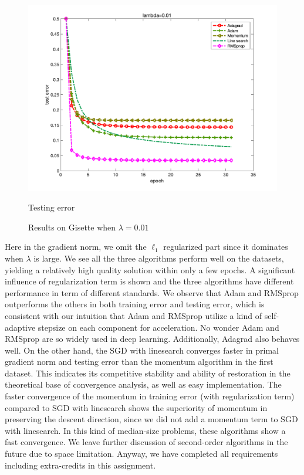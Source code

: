 \documentclass{article}
\begin{document}
\begin{figure}[H]
\begin{minipage}{0.33\linewidth}
	\includegraphics[width=1\linewidth]{./fig/err_g4}
	\caption{Testing error}
\end{minipage}
\caption*{Results on Gisette when $\lambda=0.01$}
\end{figure}
Here in the gradient norm, we omit the $\ell_1$ regularized part since it dominates when $\lambda$ is large. We see all the three algorithms perform well on the datasets, yielding a relatively high quality solution within only a few epochs. A significant influence of regularization term is shown and the three algorithms have different performance in term of different standards. We observe that Adam and RMSprop outperforms the others in both training error and testing error, which is consistent with our intuition that Adam and RMSprop utilize a kind of self-adaptive stepsize on each component for acceleration. No wonder Adam and RMSprop are so widely used in deep learning. Additionally, Adagrad also behaves well. On the other hand, the SGD with linesearch converges faster in primal gradient norm and testing error than the momentum algorithm in the first dataset. This indicates its competitive stability and ability of restoration in the theoretical base of convergence analysis, as well as easy implementation. The faster convergence of the momentum in training error (with regularization term) compared to SGD with linesearch shows the superiority of momentum in preserving the descent direction, since we did not add a momentum term to SGD with linesearch. In this kind of median-size problems, these algorithms show a fast convergence. We leave further discussion of second-order algorithms in the future due to space limitation. Anyway, we have completed all requirements including extra-credits in this assignment.
  

\end{document}
